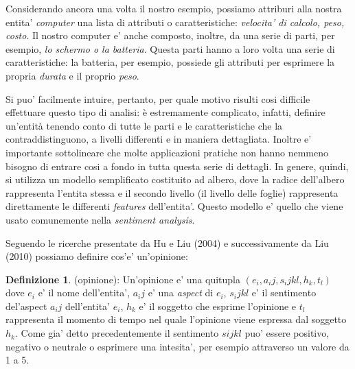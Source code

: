 \documentclass[a4paper,12pt,openright,twoside]{report}
\theoremstyle{definition}
\newtheorem{defi}{Definizione}[section]
\begin{document}
Considerando ancora una volta il nostro esempio, possiamo attriburi alla nostra entita' \emph{computer}
una lista di attributi o caratteristiche: \emph{velocita' di calcolo, peso, costo}. Il nostro computer e' anche composto,
inoltre, da una serie di parti, per esempio, \emph{lo schermo o la batteria}. Questa parti hanno a loro volta
una serie di caratteristiche: la batteria, per esempio, possiede gli attributi per esprimere la 
propria \emph{durata} e il proprio \emph{peso}.

Si puo' facilmente intuire, pertanto, per quale motivo risulti cosi difficile effettuare questo tipo di analisi:
è estremamente complicato, infatti, definire un’entità tenendo conto di tutte le parti e le caratteristiche che la contraddistinguono, a livelli differenti e in  maniera dettagliata.
Inoltre e' importante sottolineare che molte applicazioni pratiche non hanno nemmeno bisogno di entrare cosi
a fondo in tutta questa serie di dettagli.
In genere, quindi, si utilizza un modello semplificato costituito ad albero, dove la radice dell'albero 
rappresenta l'entita stessa
e il secondo livello (il livello delle foglie) rappresenta direttamente le differenti \emph{features} dell'entita'.
Questo modello e' quello che viene usato comunemente nella \emph{sentiment analysis}.

Seguendo le ricerche presentate da Hu e Liu (2004) e successivamente da Liu (2010) possiamo
definire cos'e' un'opinione:

\begin{defi}(opinione): Un'opinione e' una quitupla $(e_i, a_ij, s_ijkl, h_k, t_l)$ dove
$e_i$ e' il nome dell'entita', $a_ij$ e' una \emph{aspect} di $e_i$, $s_ijkl$ e' il
sentimento del'aspect $a_ij$ dell'entita' $e_i$, $h_k$ e' il soggetto che esprime l'opinione e $t_l$
rappresenta il momento di tempo nel quale l'opinione viene espressa dal soggetto $h_k$.
Come gia' detto precedentemente il sentimento $sijkl$ puo' essere positivo, negativo o neutrale o esprimere una intesita',
per esempio attraverso un valore da 1 a 5.
\end{defi}
\end{document}
